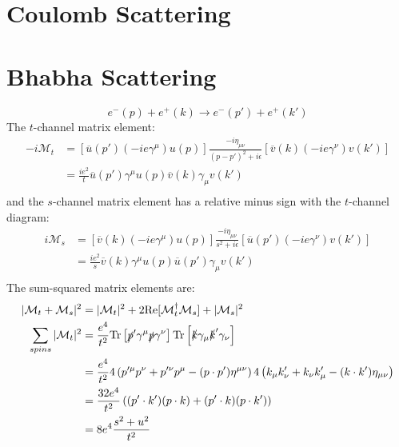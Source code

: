\documentclass[12pt]{article}
\newcommand{\tr}{\text{Tr}}
\theoremstyle{definition}
\begin{document}
\section{Coulomb Scattering}

\section{Bhabha Scattering}
\begin{equation*}
    e^-(p) + e^+(k) \to e^-(p') + e^+(k')
\end{equation*}
The $t$-channel matrix element:
\begin{equation*}
\begin{split}
    -i\mathcal{M}_t
        &= \left[ \overline{u}(p') (-ie\gamma^\mu) u(p) \right] \frac{-i\eta_{\mu\nu}}{(p-p')^2 + i\epsilon} \left[ \overline{v}(k) (-ie\gamma^\nu) v(k') \right] \\
        &= \frac{ie^2}{t} \overline{u}(p') \gamma^\mu u(p) \overline{v}(k) \gamma_\mu v(k') \\
\end{split}
\end{equation*}
and the $s$-channel matrix element has a relative minus sign with the $t$-channel diagram:
\begin{equation*}
\begin{split}
    i\mathcal{M}_s
        &= \left[ \overline{v}(k) (-ie\gamma^\mu) u(p) \right] \frac{-i\eta_{\mu\nu}}{s^2 + i\epsilon} \left[ \overline{u}(p')(-ie\gamma^\nu)v(k') \right] \\
        &= \frac{ie^2}{s} \overline{v}(k) \gamma^\mu u(p) \overline{u}(p') \gamma_\mu v(k') \\
\end{split}
\end{equation*}
The sum-squared matrix elements are:
\begin{equation*}
\begin{split}
    |\mathcal{M}_t + \mathcal{M}_s|^2
        &= |\mathcal{M}_t|^2 + 2\text{Re}[\mathcal{M}_t^\dagger \mathcal{M}_s] + |\mathcal{M}_s|^2 \\
    \sum_{spins} |\mathcal{M}_t|^2
        &= \frac{e^4}{t^2} \tr \left[ \slashed{p}' \gamma^\mu \slashed{p} \gamma^\nu \right] \tr \left[ \slashed{k} \gamma_\mu \slashed{k}' \gamma_\nu \right]  \\
        &= \frac{e^4}{t^2} 4\left( p'^\mu p^\nu + p'^\nu p^\mu - (p \cdot p') \eta^{\mu\nu} \right) 4\left( k_\mu k'_\nu + k_\nu k'_\mu - (k \cdot k')\eta_{\mu\nu} \right) \\
        &= \frac{32e^4}{t^2} \left( (p' \cdot k') (p \cdot k) + (p' \cdot k)(p \cdot k') \right) \\
        &= 8e^4 \frac{s^2 + u^2}{t^2} \\
\end{split}
\end{equation*}
\end{document}
